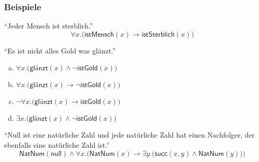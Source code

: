 \documentclass[onlymath]{beamer}
\begin{document}
\begin{frame}\frametitle{Beispiele}

\alert{"`Jeder Mensch ist sterblich."'}
\[ \forall x.\big(\textsf{istMensch}(x)\to\textsf{istSterblich}(x)\big)\]

\pause\alert{"`Es ist nicht alles Gold was glänzt."'}\pause
\begin{center}\begin{minipage}{6.5cm}
\begin{enumerate}[(a)]
\item $\forall x.\big(\textsf{glänzt}(x)\wedge\neg\textsf{istGold}(x)\big)$ 
\item $\forall x.\big(\textsf{glänzt}(x)\to\neg\textsf{istGold}(x)\big)$ 
\item $\neg\forall x.\big(\textsf{glänzt}(x)\to\textsf{istGold}(x)\big)$ 
\item $\exists x.\big(\textsf{glänzt}(x)\wedge\neg\textsf{istGold}(x)\big)$ 
\end{enumerate}\end{minipage}\end{center}

\pause\pause\bigskip
\alert{"`Null ist eine natürliche Zahl und jede natürliche Zahl hat einen Nachfolger, der
ebenfalls eine natürliche Zahl ist."'}
\[ \textsf{NatNum}(\textsf{null})\wedge \forall x.\Big(\textsf{NatNum}(x)\to\exists y.\big(\textsf{succ}(x,y)\wedge \textsf{NatNum}(y)\big)\Big)\]


\end{frame}
\end{document}
